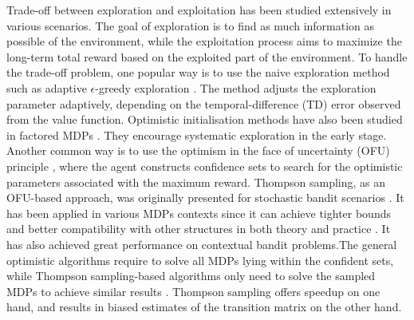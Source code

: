 \documentclass{article}
\theoremstyle{plain}
\theoremstyle{definition}
\theoremstyle{remark}
\begin{document}

Trade-off between exploration and exploitation has been studied extensively in various scenarios. The goal of exploration is to find as much information as possible of the environment, while the exploitation process aims to maximize the long-term total reward based on the exploited part of the environment. To handle the trade-off problem, one popular way is to use the naive exploration method such as adaptive $\epsilon$-greedy exploration \citep{tokic2010adaptive}. The method adjusts the exploration parameter adaptively, depending on the temporal-difference (TD) error observed from the value function. Optimistic initialisation methods have also been studied in factored MDPs \citep{inproceedings,10.1162/153244303765208377}. They encourage systematic exploration in the early stage. Another common way is to use the optimism in the face of uncertainty (OFU) principle \citep{lai1985asymptotically}, where the agent constructs confidence sets to search for the optimistic parameters associated with the maximum reward. Thompson sampling, as an OFU-based approach, was originally presented for stochastic bandit scenarios \citep{thompson1933likelihood}. It has been applied in various MDPs contexts \citep{osband2013more,agrawal2012analysis} since it can achieve tighter bounds \citep{ding2021efficient,oh2019thompson,moradipari2019safe} and better compatibility with other structures in both theory and practice \citep{chapelle2011empirical,Zhang2021NeuralTS,agrawal2013further}. It has also achieved great performance on contextual bandit problems\citep{agrawal2017optimistic}\citep{osband2017posterior}\citep{osband2019deep}.The general optimistic algorithms require to solve all MDPs lying within the confident sets, while Thompson sampling-based algorithms only need to solve the sampled MDPs to achieve similar results \citep{russo2014learning}. Thompson sampling offers speedup on one hand, and results in biased estimates of the transition matrix on the other hand.
\end{document}
